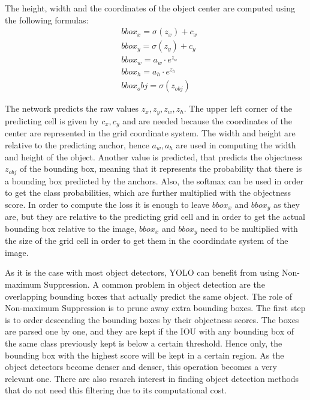 The height, width and the coordinates of the object center are computed using the following formulas:
\begin{equation}
\begin{split}
    & bbox_x = \sigma(z_x) + c_x \\
    & bbox_y = \sigma(z_y) + c_y \\
    & bbox_w = a_w \cdot e^{z_w} \\ 
    & bbox_h = a_h \cdot e^{z_h} \\
    & bbox_obj = \sigma(z_{obj})
\end{split}
\label{conversion_formulas}
\end{equation}

The network predicts the raw values $z_x, z_y, z_w, z_h$. The upper left corner of the predicting cell is given by $c_x, c_y$ and are needed because the coordinates of the center are represented in the grid coordinate system. The width and height are relative to the predicting anchor, hence $a_w, a_h$ are used in computing the width and height of the object. Another value is predicted, that predicts the objectness $z_{obj}$ of the bounding box, meaning that it represents the probability that there is a bounding box predicted by the anchors. Also, the softmax can be used in order to get the class probabilities, which are further multiplied with the objectness score. In order to compute the loss it is enough to leave $bbox_x$ and $bbox_y$ as they are, but they are relative to the predicting grid cell and in order to get the actual bounding box relative to the image, $bbox_x$ and $bbox_y$ need to be multiplied with the size of the grid cell in order to get them in the coordindate system of the image.

As it is the case with most object detectors, YOLO can benefit from using Non-maximum Suppression. A common problem in object detection are the overlapping bounding boxes that actually predict the same object. The role of Non-maximum Suppression is to prune away extra bounding boxes. The first step is to order descending the bounding boxes by their objectness scores. The boxes are parsed one by one, and they are kept if the IOU with any bounding box of the same class previously kept is below a certain threshold. Hence only, the bounding box with the highest score will be kept in a certain region. As the object detectors become denser and denser, this operation becomes a very relevant one. There are also resarch interest in finding object detection methods that do not need this filtering due to its computational cost.



